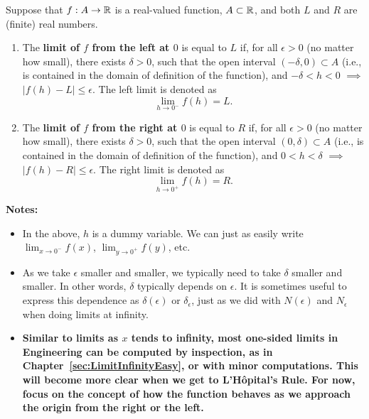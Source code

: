 \begin{tcolorbox}[colback=mylightblue, title = {\bf One-sided Limits at Zero}, breakable]
\begin{definition}
\label{def:OneSidedlimitsAtZero}
Suppose that  $f:A \to  \mathbb R$ is a real-valued function, $A \subset \mathbb R$, and both $L$ and $ R$ are (finite) real numbers. 

\begin{enumerate}
\renewcommand{\labelenumi}{(\alph{enumi})}
\setlength{\itemsep}{.2cm}
    \item The \textbf{limit of $f$ from the left at $0$} is equal to $L$ if, for all $\epsilon >0$ (no matter how small), there exists $\delta > 0$, such that the open interval $(-\delta, 0) \subset A$ (i.e., is contained in the domain of definition of the function), and $-\delta < h < 0$ $\implies$ $|f(h) - L| \le \epsilon$. The left limit is denoted as
    $$ \lim_{h \to 0^-} f(h) = L.$$ 

      \item The \textbf{limit of $f$ from the right at $0$} is equal to $R$ if, for all $\epsilon >0$ (no matter how small), there exists $\delta > 0$, such that the open interval $(0, \delta) \subset A$ (i.e., is contained in the domain of definition of the function), and $0 < h < \delta$ $\implies$ $|f(h) - R| \le \epsilon$. The right limit is denoted as
    $$ \lim_{h \to 0^+} f(h) = R.$$ 
\end{enumerate}

\end{definition}
\textbf{Notes:}
\begin{itemize}

   \item In the above, $h$ is a dummy variable. We can just as easily write $ \displaystyle \lim_{x \to 0^-} f(x) $, $ \displaystyle \lim_{y \to 0^+} f(y) $, etc.

    \item As we take $\epsilon$ smaller and smaller, we typically need to take $\delta$ smaller and smaller. In other words, $\delta$ typically depends on $\epsilon$. It is sometimes useful to express this dependence as $\delta(\epsilon)$ or $\delta_\epsilon$, just as we did with $N(\epsilon)$ and $N_\epsilon$ when doing limits at infinity. 

    \item \textbf{Similar to limits as $x$ tends to infinity, most one-sided limits in Engineering can be computed by inspection, as in Chapter~\ref{sec:LimitInfinityEasy}, or with minor computations. This will become more clear when we get to L'H\^{o}pital's Rule. For now, focus on the concept of how the function behaves as we approach the origin from the right or the left. }
\end{itemize}
\end{tcolorbox}


